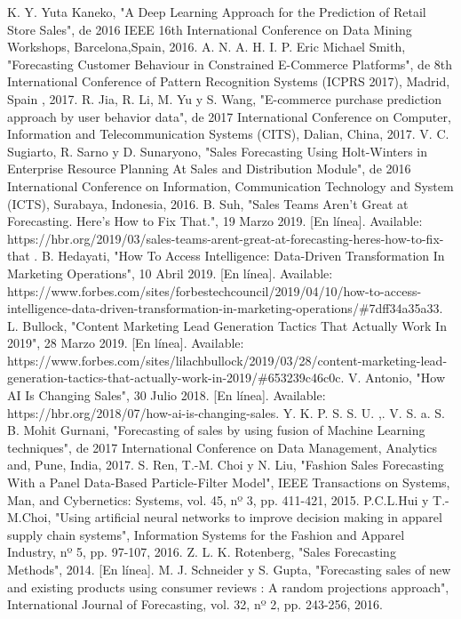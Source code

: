 \documentclass[conference]{IEEEtran}
\begin{document}
\begin{thebibliography}{00}
     K. Y. Yuta Kaneko, "A Deep Learning Approach for the Prediction of Retail Store Sales", de 2016 IEEE 16th International Conference on Data Mining Workshops, Barcelona,Spain, 2016.
     A. N. A. H. I. P. Eric Michael Smith, "Forecasting Customer Behaviour in Constrained E-Commerce Platforms", de 8th   International Conference of Pattern Recognition Systems (ICPRS 2017), Madrid, Spain , 2017.
     R. Jia, R. Li, M. Yu y S. Wang, "E-commerce purchase prediction approach by user behavior data", de 2017 International Conference on Computer, Information and Telecommunication Systems (CITS), Dalian, China, 2017.
     V. C. Sugiarto, R. Sarno y D. Sunaryono, "Sales Forecasting Using Holt-Winters in Enterprise Resource Planning At Sales and Distribution Module", de 2016 International Conference on Information, Communication Technology and System (ICTS), Surabaya, Indonesia, 2016.
     B. Suh, "Sales Teams Aren’t Great at Forecasting. Here’s How to Fix That.", 19 Marzo 2019. [En línea]. Available: https://hbr.org/2019/03/sales-teams-arent-great-at-forecasting-heres-how-to-fix-that .
     B. Hedayati, "How To Access Intelligence: Data-Driven Transformation In Marketing Operations", 10 Abril 2019. [En línea]. Available: https://www.forbes.com/sites/forbestechcouncil/2019/04/10/how-to-access-intelligence-data-driven-transformation-in-marketing-operations/\#7dff34a35a33.
     L. Bullock, "Content Marketing Lead Generation Tactics That Actually Work In 2019", 28 Marzo 2019. [En línea]. Available: https://www.forbes.com/sites/lilachbullock/2019/03/28/content-marketing-lead-generation-tactics-that-actually-work-in-2019/\#653239c46c0c.
     V. Antonio, "How AI Is Changing Sales", 30 Julio 2018. [En línea]. Available: https://hbr.org/2018/07/how-ai-is-changing-sales.
     Y. K. P. S. S. U. ,. V. S. a. S. B. Mohit Gurnani, "Forecasting of sales by using fusion of Machine Learning techniques", de 2017 International Conference on Data Management, Analytics and, Pune, India, 2017.
     S. Ren, T.-M. Choi y N. Liu, "Fashion Sales Forecasting With a Panel Data-Based Particle-Filter Model", IEEE Transactions on Systems, Man, and Cybernetics: Systems, vol. 45, nº 3, pp. 411-421, 2015.
     P.C.L.Hui y T.-M.Choi, "Using artificial neural networks to improve decision making in apparel supply chain systems", Information Systems for the Fashion and Apparel Industry, nº 5, pp. 97-107, 2016.
     Z. L. K. Rotenberg, "Sales Forecasting Methods", 2014. [En línea].
     M. J. Schneider y S. Gupta, "Forecasting sales of new and existing products using consumer reviews : A random projections approach", International Journal of Forecasting, vol. 32, nº 2, pp. 243-256, 2016.

\end{thebibliography}
\end{document}
